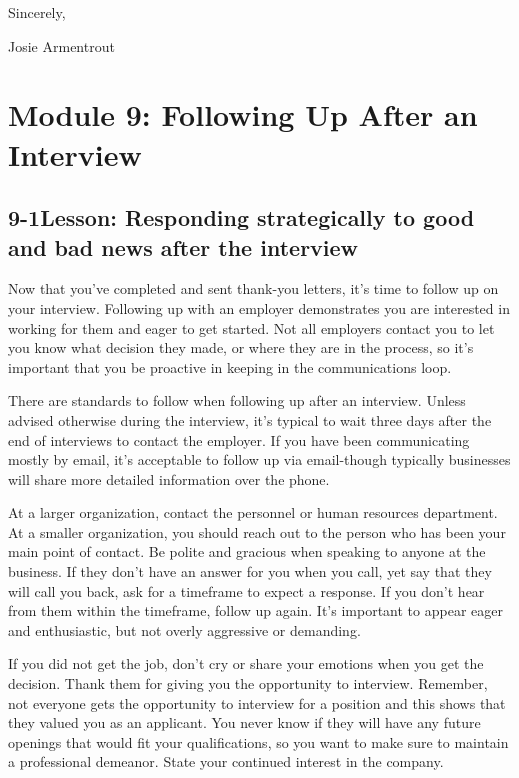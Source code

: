Sincerely,

Josie Armentrout


\pagebreak \section*{Module 9:	Following Up After an Interview}
\noindent\makebox[\textwidth]{\rule{\linewidth}{0.4pt}}  \localtableofcontents
\noindent\makebox[\textwidth]{\rule{\linewidth}{0.4pt}}


\pagebreak \subsection*{9-1\quad Lesson: Responding strategically to good and bad news after the interview}
Now that you've completed and sent thank-you letters, it's time to follow up on your interview. Following up with an employer demonstrates you are interested in working for them and eager to get started. Not all employers contact you to let you know what decision they made, or where they are in the process, so it's important that you be proactive in keeping in the communications loop.

There are standards to follow when following up after an interview. Unless advised otherwise during the interview, it's typical to wait three days after the end of interviews to contact the employer. If you have been communicating mostly by email, it's acceptable to follow up via email-though typically businesses will share more detailed information over the phone.

At a larger organization, contact the personnel or human resources department. At a smaller organization, you should reach out to the person who has been your main point of contact. Be polite and gracious when speaking to anyone at the business. If they don't have an answer for you when you call, yet say that they will call you back, ask for a timeframe to expect a response. If you don't hear from them within the timeframe, follow up again. It's important to appear eager and enthusiastic, but not overly aggressive or demanding.

If you did not get the job, don't cry or share your emotions when you get the decision. Thank them for giving you the opportunity to interview. Remember, not everyone gets the opportunity to interview for a position and this shows that they valued you as an applicant. You never know if they will have any future openings that would fit your qualifications, so you want to make sure to maintain a professional demeanor. State your continued interest in the company.

